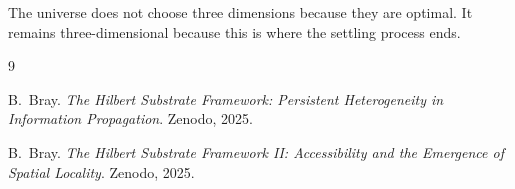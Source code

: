 \documentclass[11pt]{article}
\begin{document}
The universe does not choose three dimensions because they are optimal. It remains three-dimensional because this is where the settling process ends.


\begin{thebibliography}{9}

B.~Bray.
\newblock \emph{The Hilbert Substrate Framework: Persistent Heterogeneity in Information Propagation}.
\newblock Zenodo, 2025.

B.~Bray.
\newblock \emph{The Hilbert Substrate Framework II: Accessibility and the Emergence of Spatial Locality}.
\newblock Zenodo, 2025.

\end{thebibliography}
\end{document}
